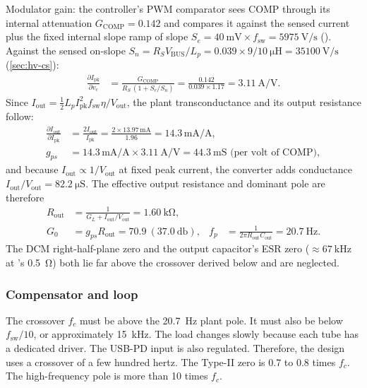 Modulator gain: the controller's PWM comparator sees COMP through its internal
attenuation $G_{\mathrm{COMP}} = 0.142$ and compares it against the sensed current
plus the fixed internal slope ramp of slope $S_e = \SI{40}{\milli\volt}\times
f_{\mathrm{sw}} = \SI{5975}{\volt\per\second}$ (). Against
the sensed on-slope $S_n = R_S V_{\mathrm{BUS}}/L_p = 0.039\times9/\SI{10}{\micro\henry}
= \SI{35100}{\volt\per\second}$ (\cref{sec:hv-cs}):
\begin{align*}
  \frac{\partial I_{\mathrm{pk}}}{\partial v_c}
    &= \frac{G_{\mathrm{COMP}}}{R_S\,(1 + S_e/S_n)}
     = \frac{0.142}{0.039 \times 1.17}
     = \SI{3.11}{\ampere\per\volt}.
\end{align*}
Since $I_{\mathrm{out}} = \tfrac{1}{2} L_p I_{\mathrm{pk}}^2 f_{\mathrm{sw}}
\eta / V_{\mathrm{out}}$, the plant transconductance and its output resistance
follow:
\begin{align*}
  \frac{\partial I_{\mathrm{out}}}{\partial I_{\mathrm{pk}}}
    &= \frac{2 I_{\mathrm{out}}}{I_{\mathrm{pk}}}
     = \frac{2 \times 13.97\,\si{\milli\ampere}}{1.96}
     = 14.3\,\si{\milli\ampere\per\ampere},\\
     g_{ps} &= 14.3\,\si{\milli\ampere\per\ampere} \times \SI{3.11}{\ampere\per\volt}
     = \SI{44.3}{\milli\siemens} \text{ (per volt of COMP)},
\end{align*}
and because $I_{\mathrm{out}} \propto 1/V_{\mathrm{out}}$ at fixed peak current,
the converter adds conductance $I_{\mathrm{out}}/V_{\mathrm{out}} =
\SI{82.2}{\micro\siemens}$. The effective output resistance and dominant pole
are therefore
\begin{align*}
  R_{\mathrm{out}} &= \frac{1}{G_L+I_{\mathrm{out}}/V_{\mathrm{out}}}
       = \SI{1.60}{\kilo\ohm},\\
  G_0 &= g_{ps}R_{\mathrm{out}} = 70.9\ (\SI{37.0}{\decibel}), &
  f_p &= \frac{1}{2\pi R_{\mathrm{out}} C_{\mathrm{out}}}
       = \SI{20.7}{\hertz}.
\end{align*}
The DCM right-half-plane zero and the output capacitor's ESR zero
($\approx\SI{67}{\kilo\hertz}$ at 's \SI{0.5}{\ohm}) both lie far
above the crossover derived below and are neglected.

\subsubsection{Compensator and loop}

The crossover $f_c$ must be above the \SI{20.7}{\hertz} plant pole. It must also
be below $f_{\mathrm{sw}}/10$, or approximately \SI{15}{\kilo\hertz}. The load
changes slowly because each tube has a dedicated driver. The USB-PD input is
also regulated. Therefore, the design uses a crossover of a few hundred hertz.
The Type-II zero is 0.7 to 0.8 times $f_c$. The high-frequency pole is more
than 10 times $f_c$.

